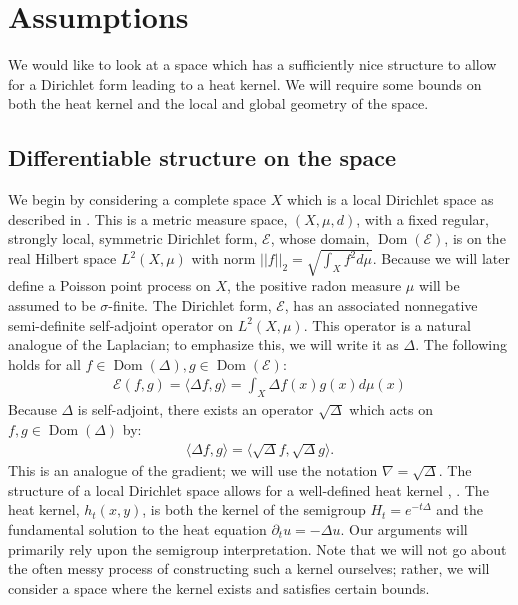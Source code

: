 \documentclass[letterpaper,oneside,english]{amsart}
\begin{document}
\section{Assumptions}\label{Assumptions}
We would like to look at a space which has a sufficiently nice structure to allow for a Dirichlet form leading to a heat kernel.  We will require some bounds on both the heat kernel and the local and global geometry of the space.  

\subsection{Differentiable structure on the space} \label{Differentiable} We begin by considering a complete space $X$ which is a local Dirichlet space as described in \cite{Sturm}.  This is a metric measure space, $(X,\mu,d)$, with
a fixed regular, strongly local, symmetric Dirichlet form, ${\mathcal{E}}$, whose
domain, ${\operatorname{Dom}}({\mathcal{E}})$, is on the real Hilbert space $L^2(X,\mu)$ with
norm $||f||_2 = \sqrt{\int_X f^2 d\mu}$. Because we will later define a Poisson point process on $X$, the positive radon measure $\mu$ will be assumed to be $\sigma$-finite.  The Dirichlet form, ${\mathcal{E}}$, has an associated nonnegative semi-definite self-adjoint operator
on $L^2(X, \mu)$.  This operator is a natural analogue of the Laplacian; to emphasize this, we will write it as $\Delta$.   The following holds for all
$f\in {\operatorname{Dom}}(\Delta), g \in {\operatorname{Dom}}({\mathcal{E}})$:
\begin{eqnarray*}
{\mathcal{E}}(f,g) = \langle \Delta f,g \rangle = \int_X \Delta f(x)g(x)d\mu(x)
\end{eqnarray*}Because $\Delta$ is self-adjoint, there exists an operator
$\sqrt{\Delta}$ which acts on $f,g \in {\operatorname{Dom}}(\Delta)$ by:
\begin{eqnarray*}
\langle \Delta f,g\rangle = \langle \sqrt{\Delta} f, \sqrt{\Delta}g \rangle.
\end{eqnarray*}
This is an analogue of the gradient; we will use the notation ${\nabla} =
\sqrt{\Delta}$.
The structure of a local Dirichlet space allows for a well-defined heat kernel \cite{SturmDiffHK}, \cite{SturmDif}.   The heat kernel, $h_t(x,y)$, is both the kernel of the semigroup
$H_t=e^{-t\Delta}$ and the fundamental solution to the heat
equation  $ {\partial}_t u = - \Delta u.$  Our arguments will primarily rely upon the semigroup interpretation.  Note that we will not go about the often messy process of constructing such a kernel ourselves; rather, we will consider a space where the kernel exists and satisfies certain bounds.
\end{document}
